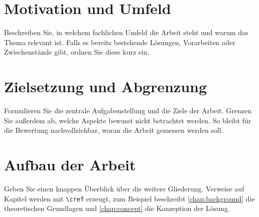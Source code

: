 
\section{Motivation und Umfeld}

Beschreiben Sie, in welchem fachlichen Umfeld die Arbeit steht und warum das
Thema relevant ist. Falls es bereits bestehende Lösungen, Vorarbeiten oder
Zwischenstände gibt, ordnen Sie diese kurz ein.

\section{Zielsetzung und Abgrenzung}

Formulieren Sie die zentrale Aufgabenstellung und die Ziele der Arbeit. Grenzen
Sie außerdem ab, welche Aspekte bewusst nicht betrachtet werden. So bleibt für
die Bewertung nachvollziehbar, woran die Arbeit gemessen werden soll.

\section{Aufbau der Arbeit}

Geben Sie einen knappen Überblick über die weitere Gliederung. Verweise auf
Kapitel werden mit \verb|\cref| erzeugt, zum Beispiel beschreibt
\cref{chap:background} die theoretischen Grundlagen und \cref{chap:concept}
die Konzeption der Lösung.
